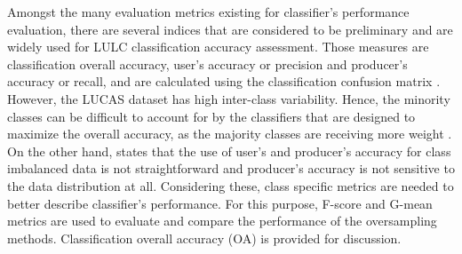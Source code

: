 \documentclass[parskip=full]{scrartcl}
\begin{document}
Amongst the many evaluation metrics existing for classifier's performance
evaluation, there are several indices that are considered to be preliminary and
are widely used for LULC classification accuracy assessment. Those measures are
classification overall accuracy, user's accuracy or precision and producer's
accuracy or recall,  and are calculated using the classification confusion
matrix \cite{Liu2007}. However, the LUCAS dataset has high inter-class
variability. Hence, the minority classes can be difficult to account for by the
classifiers that are designed to maximize the overall accuracy, as the majority
classes are receiving more weight \cite{Inglada2017}. On the other hand,
\cite{He2008} states that the use of user's and producer's accuracy for class
imbalanced data is not straightforward and producer's accuracy is not sensitive
to the data distribution at all. Considering these, class specific metrics are
needed to better describe classifier's performance. For this purpose, F-score
and G-mean metrics are used to evaluate and compare the performance of the
oversampling methods. Classification overall accuracy (OA) is provided for
discussion.
\end{document}
